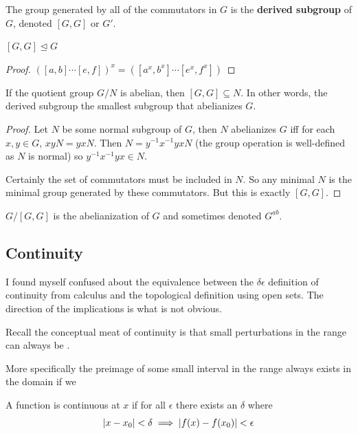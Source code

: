 \documentclass[10pt]{article}
\begin{document}
\begin{definition}
	The group generated by all of the commutators in $G$ is the \textbf{derived
	subgroup} of $G$, denoted $[G, G]$ or $G'$.
\end{definition}

\begin{theorem}
	$[G, G] \trianglelefteq G$
\end{theorem}

\begin{proof}
	$([a, b] \cdots [e, f])^x = ([a^x, b^x] \cdots [e^x, f^x])$
\end{proof}

\begin{theorem}
	If the quotient group $G / N$ is abelian, then $[G, G] \subseteq N$. In other
	words, the derived subgroup the smallest subgroup that abelianizes $G$.
\end{theorem}

\begin{proof}
	Let $N$ be some normal subgroup of $G$, then $N$ abelianizes $G$ iff for each
	$x, y \in G$, $xyN = yxN$. Then $N = y^{-1}x^{-1}yxN$ (the group operation is
	well-defined as $N$ is normal) so $y^{-1}x^{-1}yx \in N$. 

	Certainly the set of commutators must be included in $N$. So any minimal $N$
	is the minimal group generated by these commutators. But this is exactly $[G,
	G]$.
\end{proof}

\begin{definition}
	$G / [G, G]$ is the abelianization of $G$ and sometimes denoted $G^{ab}$.
\end{definition}


\subsection{Continuity}

I found myself confused about the equivalence between the $\delta \epsilon$
definition of continuity from calculus and the topological definition using
open sets. The direction of the implications is what is not obvious.

Recall the conceptual meat of continuity is that small perturbations in the
range can always be . 

More specifically the preimage of some small interval in the range
always exists in the domain if we

\begin{definition}
	A function is continuous at $x$ if for all $\epsilon$ there exists an
	$\delta$ where
	\[\lvert x - x_0\rvert < \delta \implies \lvert f(x) - f(x_0)\rvert < \epsilon\]
\end{definition}
\end{document}

